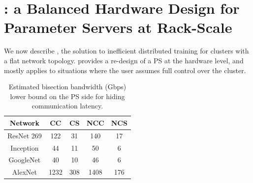 \chapter{\pbox: a Balanced Hardware Design for Parameter Servers at Rack-Scale}
\label{sec:phub}
We now describe \pbox, the solution to inefficient distributed training for clusters with a flat network topology. \pbox provides a re-design of a PS at the hardware level, and mostly applies to situations where the user assumes full control over the cluster.

\begin{table}
        \centering
        \footnotesize
	\begin{tabular}{|c|c|c|c|c|}
		\hline
		Network   & CC & CS & NCC & NCS\\
		\hline
		ResNet 269    & 122   & 31   & 140    &  17   \\
		\hline
		Inception & 44   &  11  &  50   &  6  \\
		\hline
		GoogleNet & 40   &  10  &  46   &  6  \\
	
		\hline 
		AlexNet   & 1232  &  308  & 1408    &  176  \\
		\hline
	\end{tabular}
	\caption{Estimated bisection bandwidth (Gbps) lower bound on the PS side for hiding communication latency.}
	\label{table:bwReqDC}
\end{table}

